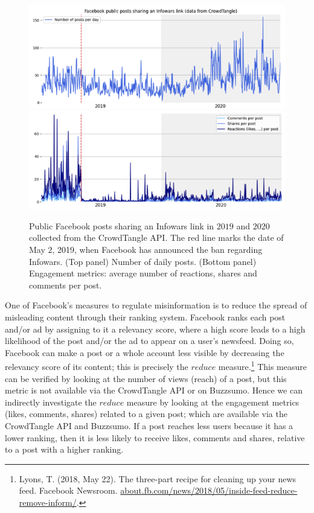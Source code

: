 \documentclass{article}
\begin{document}
\begin{figure}
	\centering
	
		\includegraphics[scale=0.3]{./img/infowars/fb_infowars_1.png}
		\includegraphics[scale=0.3]{./img/infowars/fb_infowars_2.png} 
	
	\caption{Public Facebook posts sharing an Infowars link in $2019$ and $2020$ collected from the CrowdTangle API. The red line marks the date of May $2$, 2019, when Facebook has announced the ban regarding Infowars. (Top panel) Number of daily posts. (Bottom panel) Engagement metrics: average number of reactions, shares and comments per post. }
	\label{infowars1}
\end{figure}

One of Facebook’s measures to regulate misinformation is to reduce the spread of misleading content through their ranking system. Facebook ranks each post and/or ad by assigning to it a relevancy score, where a high score leads to a high likelihood of the post and/or the ad to appear on a user's newsfeed. Doing so, Facebook can make a post or a whole account less visible by decreasing the relevancy score of its content; this is precisely the $reduce$ measure.\footnote{Lyons, T. (2018, May 22). The three-part recipe for cleaning up your news feed. Facebook Newsroom. \href{https://about.fb.com/news/2018/05/inside-feed-reduce-remove-inform/}{about.fb.com/news/2018/05/inside-feed-reduce-remove-inform/}.} This measure can be verified by looking at the number of views (reach) of a post, but this metric is not available via the CrowdTangle API or on Buzzsumo. Hence we can indirectly investigate the $reduce$ measure by looking at the engagement metrics (likes, comments, shares) related to a given post; which are available via the CrowdTangle API and Buzzsumo. If a post reaches less users because it has a lower ranking, then it is less likely to receive likes, comments and shares, relative to a post with a higher ranking. 
\end{document}
